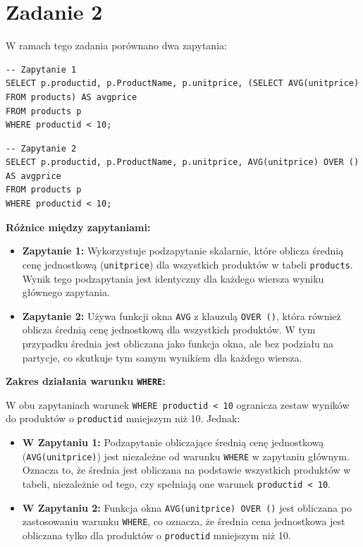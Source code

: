 \documentclass{article}
\begin{document}
\section*{Zadanie 2}

W ramach tego zadania porównano dwa zapytania:

\begin{lstlisting}
-- Zapytanie 1 
SELECT p.productid, p.ProductName, p.unitprice, (SELECT AVG(unitprice) FROM products) AS avgprice 
FROM products p 
WHERE productid < 10;
\end{lstlisting}

\begin{lstlisting}
-- Zapytanie 2 
SELECT p.productid, p.ProductName, p.unitprice, AVG(unitprice) OVER () AS avgprice 
FROM products p 
WHERE productid < 10;
\end{lstlisting}
\textbf{Różnice między zapytaniami:}

\begin{itemize}
    \item \textbf{Zapytanie 1:} Wykorzystuje podzapytanie skalarnie, które oblicza średnią cenę jednostkową (\texttt{unitprice}) dla wszystkich produktów w tabeli \texttt{products}. Wynik tego podzapytania jest identyczny dla każdego wiersza wyniku głównego zapytania.
    \item \textbf{Zapytanie 2:} Używa funkcji okna \texttt{AVG} z klauzulą \texttt{OVER ()}, która również oblicza średnią cenę jednostkową dla wszystkich produktów. W tym przypadku średnia jest obliczana jako funkcja okna, ale bez podziału na partycje, co skutkuje tym samym wynikiem dla każdego wiersza.
\end{itemize}
\textbf{Zakres działania warunku \texttt{WHERE}:}

W obu zapytaniach warunek \texttt{WHERE productid < 10} ogranicza zestaw wyników do produktów o \texttt{productid} mniejszym niż 10. Jednak:

\begin{itemize}
    \item \textbf{W Zapytaniu 1:} Podzapytanie obliczające średnią cenę jednostkową (\texttt{AVG(unitprice)}) jest niezależne od warunku \texttt{WHERE} w zapytaniu głównym. Oznacza to, że średnia jest obliczana na podstawie wszystkich produktów w tabeli, niezależnie od tego, czy spełniają one warunek \texttt{productid < 10}.
    \item \textbf{W Zapytaniu 2:} Funkcja okna \texttt{AVG(unitprice) OVER ()} jest obliczana po zastosowaniu warunku \texttt{WHERE}, co oznacza, że średnia cena jednostkowa jest obliczana tylko dla produktów o \texttt{productid} mniejszym niż 10.
\end{itemize}
\end{document}
